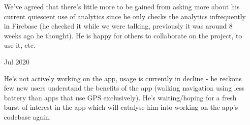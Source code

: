 We've agreed that there's little more to be gained from asking more about his current quiescent use of analytics since he only checks the analytics infrequently in Firebase (he checked it while we were talking, previously it was around 8 weeks ago he thought). He is happy for others to collaborate on the project, to use it, etc.

 Jul 2020

He's not actively working on the app, usage is currently in decline - he reckons few new users understand the benefits of the app (walking navigation using less battery than apps that use GPS exclusively). He's waiting/hoping for a fresh burst of interest in the app which will catalyse him into working on the app's codebase again. 

